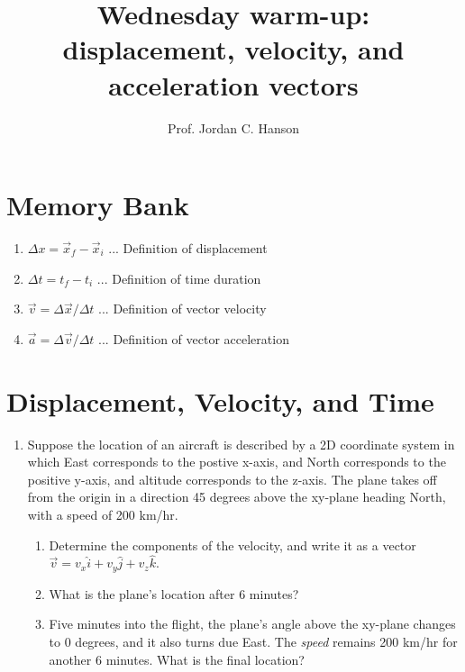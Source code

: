 \documentclass{article}
\begin{document}
\twocolumn

\title{Wednesday warm-up: displacement, velocity, and acceleration vectors}
\author{Prof. Jordan C. Hanson}

\maketitle

\section{Memory Bank}

\begin{enumerate}
\item $\Delta x = \vec{x}_f - \vec{x}_i$ ... Definition of displacement
\item $\Delta t = t_f - t_i$ ... Definition of time duration
\item $\vec{v} = \Delta \vec{x} / \Delta t$ ... Definition of vector velocity
\item $\vec{a} = \Delta \vec{v} / \Delta t$ ... Definition of vector acceleration
\end{enumerate}

\section{Displacement, Velocity, and Time}

\begin{enumerate}
\item Suppose the location of an aircraft is described by a 2D coordinate system in which East corresponds to the postive x-axis, and North corresponds to the positive y-axis, and altitude corresponds to the z-axis.  The plane takes off from the origin in a direction 45 degrees above the xy-plane heading North, with a speed of 200 km/hr.
\begin{enumerate}
\item Determine the components of the velocity, and write it as a vector $\vec{v} = v_x \hat{i} + v_y \hat{j} + v_{z} \hat{k}$. \\ \vspace{1.5cm}
\item What is the plane's location after 6 minutes? \\ \vspace{1.5cm}
\item Five minutes into the flight, the plane's angle above the xy-plane changes to 0 degrees, and it also turns due East. The \textit{speed} remains 200 km/hr for another 6 minutes.  What is the final location? \\ \vspace{1.5cm}
\end{enumerate}
\end{enumerate}
\end{document}
